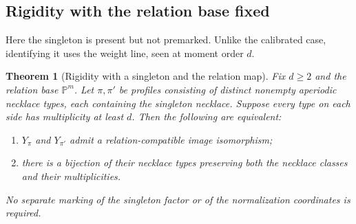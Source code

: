 \documentclass[10pt,fleqn]{article}
\numberwithin{equation}{section}
\newtheorem{theorem}{Theorem}[section]
\newcommand{\PP}{\mathbb P}
\begin{document}
\subsection{Rigidity with the relation base fixed}
\label{r20:spec:relation-rigidity-route}
Here the singleton is present but not premarked.  Unlike the calibrated
case, identifying it uses the weight line, seen at moment order $d$.

\begin{theorem}[Rigidity with a singleton and the relation map]
\label{v6:spec:relation-rigidity}
Fix $d\ge2$ and the relation base $\PP^m$.  Let $\pi,\pi'$ be
profiles consisting of distinct nonempty aperiodic necklace types,
each containing the singleton necklace.  Suppose every type on each
side has multiplicity at least $d$.  Then the following are equivalent:
\begin{enumerate}[label=\textup{(\roman*)}]
\item $Y_\pi$ and $Y_{\pi'}$ admit a relation-compatible image
isomorphism;
\item there is a bijection of their necklace types preserving both
the necklace classes and their multiplicities.
\end{enumerate}
No separate marking of the singleton factor or of the normalization
coordinates is required.
\end{theorem}
\end{document}
